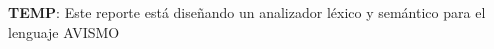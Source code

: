 \textbf{TEMP}: Este reporte está diseñando un analizador léxico y semántico para el lenguaje AVISMO \cite{narciso_farias_gramatica_2012}